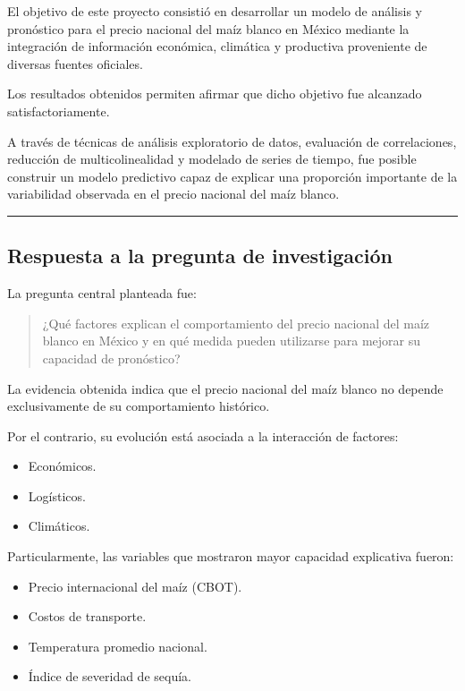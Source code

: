 \documentclass[11pt]{article}
\providecommand{\tightlist}{%
      \setlength{\itemsep}{0pt}\setlength{\parskip}{0pt}}
\begin{document}
El objetivo de este proyecto consistió en desarrollar un modelo de
análisis y pronóstico para el precio nacional del maíz blanco en México
mediante la integración de información económica, climática y productiva
proveniente de diversas fuentes oficiales.

Los resultados obtenidos permiten afirmar que dicho objetivo fue
alcanzado satisfactoriamente.

A través de técnicas de análisis exploratorio de datos, evaluación de
correlaciones, reducción de multicolinealidad y modelado de series de
tiempo, fue posible construir un modelo predictivo capaz de explicar una
proporción importante de la variabilidad observada en el precio nacional
del maíz blanco.

\begin{center}\rule{0.5\linewidth}{0.5pt}\end{center}

\hypertarget{respuesta-a-la-pregunta-de-investigaciuxf3n}{%
\subsection{Respuesta a la pregunta de
investigación}\label{respuesta-a-la-pregunta-de-investigaciuxf3n}}

La pregunta central planteada fue:

\begin{quote}
¿Qué factores explican el comportamiento del precio nacional del maíz
blanco en México y en qué medida pueden utilizarse para mejorar su
capacidad de pronóstico?
\end{quote}

La evidencia obtenida indica que el precio nacional del maíz blanco no
depende exclusivamente de su comportamiento histórico.

Por el contrario, su evolución está asociada a la interacción de
factores:

\begin{itemize}
\tightlist
\item
  Económicos.
\item
  Logísticos.
\item
  Climáticos.
\end{itemize}

Particularmente, las variables que mostraron mayor capacidad explicativa
fueron:

\begin{itemize}
\tightlist
\item
  Precio internacional del maíz (CBOT).
\item
  Costos de transporte.
\item
  Temperatura promedio nacional.
\item
  Índice de severidad de sequía.
\end{itemize}
\end{document}
